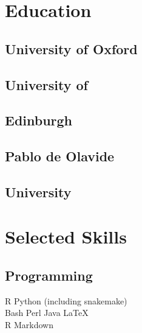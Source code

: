 \documentclass[letterpaper]{deedy-resume}
\begin{document}
	\begin{minipage}[t]{0.29\textwidth} 
		
		\section{Education} 
		
		\subsection{University of Oxford}
		
		\sectionspace 
		
		\subsection{University of}
		\subsection{Edinburgh}		
		
		\sectionspace 
		
		\subsection{Pablo de Olavide}
		\subsection{University}				
		
		\sectionspace 
		
		\sectionspace 
		
	
		
		\section{Selected Skills}
		
		\subsection{Programming}
		R \textbullet{} Python (including snakemake) \\
		Bash \textbullet{} Perl \textbullet{} Java  \textbullet{} LaTeX  \\
		R Markdown
		

\end{minipage}
\end{document}
